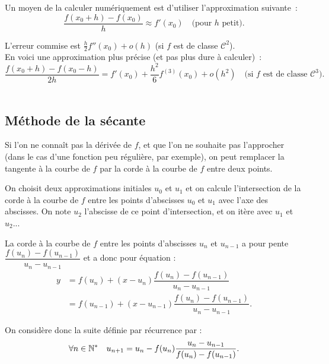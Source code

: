 Un moyen de la calculer numériquement est d'utiliser l'approximation suivante~:
\begin{equation*}
  \frac{f(x_{0}+h)-f(x_{0})}{h}\approx f'(x_{0}) \quad\text{(pour $h$ petit)}.
\end{equation*}

L'erreur commise est $\frac{h}{2}f''(x_{0}) + o(h)$ (si $f$ est de classe
$\mathcal{C}^{2}$).\\


En voici une approximation plus précise (et pas plus dure à calculer)~:
\begin{equation*}
    \frac{f(x_{0}+h)-f(x_{0}-h)}{2h} = f'(x_{0}) +
    \frac{h^{2}}{6}f^{(3)}(x_0)+o(h^{2})
    \quad\text{(si $f$ est de classe $\mathcal{C}^{3}$)}.
\end{equation*}\\



\subsection{Méthode de la sécante}
Si l'on ne connaît pas la dérivée de $f$, et que l'on ne souhaite pas l'approcher (dans le cas d'une fonction peu régulière, par exemple), on peut remplacer la tangente à la courbe de $f$ par la corde à la courbe de $f$ entre deux points. 

On choisit deux approximations initiales $u_{0}$ et $u_{1}$ et on calcule l'intersection de la corde à la courbe de $f$ entre les points d'abscisses $u_0$ et $u_1$ avec l'axe des abscisses. 
On note $u_2$ l'abscisse de ce point d'intersection, et on itère avec $u_1$ et $u_2$...
\begin{rem}
  La corde à la courbe de $f$ entre les points d'abscisses $u_n$ et $u_{n-1}$ a pour pente $\dfrac{f(u_{n})-f(u_{n-1})}{u_{n}-u_{n-1}}$ et a donc pour équation : 
  \begin{align*}
    y &= f(u_n) + (x-u_n)\dfrac{f(u_{n})-f(u_{n-1})}{u_{n}-u_{n-1}} \\
      &= f(u_{n-1}) + (x-u_{n-1})\dfrac{f(u_{n})-f(u_{n-1})}{u_{n}-u_{n-1}}.
  \end{align*}
\end{rem}
On considère donc la suite définie par récurrence par : 
\begin{equation*}
  \forall n\in\mathbb{N}^{*} \quad u_{n+1} = u_{n} -
  f(u_{n})\frac{u_{n}-u_{n-1}}{f(u_{n})-f(u_{n-1})}.
\end{equation*}

